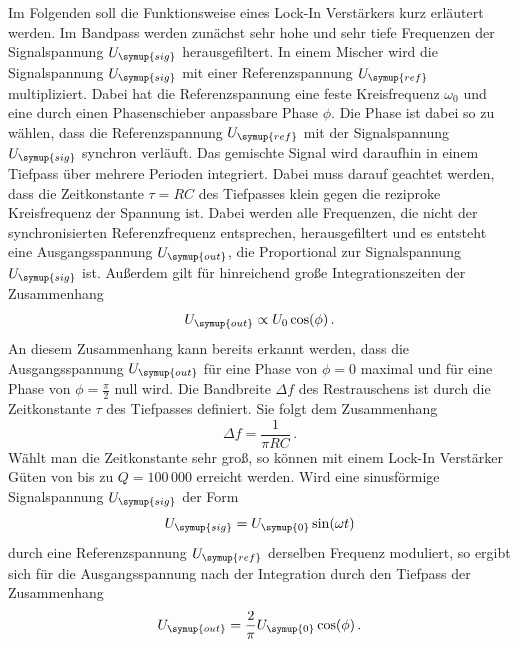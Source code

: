 Im Folgenden soll die Funktionsweise eines Lock-In Verstärkers kurz erläutert
werden. Im Bandpass werden zunächst sehr hohe und sehr tiefe Frequenzen der
Signalspannung $U_{\symup{sig}}$ herausgefiltert. In einem Mischer wird die
Signalspannung $U_{\symup{sig}}$ mit einer Referenzspannung $U_{\symup{ref}}$
multipliziert. Dabei hat die Referenzspannung eine feste Kreisfrequenz
$\omega_0$ und eine durch einen Phasenschieber anpassbare Phase $\phi$. Die Phase
ist dabei so zu wählen, dass die Referenzspannung $U_{\symup{ref}}$ mit der
Signalspannung $U_{\symup{sig}}$ synchron verläuft. Das gemischte Signal wird
daraufhin in einem Tiefpass über mehrere Perioden integriert. Dabei muss darauf
geachtet werden, dass  die Zeitkonstante $\tau=RC$ des Tiefpasses klein gegen die
reziproke Kreisfrequenz der Spannung ist. Dabei werden alle Frequenzen, die nicht
der synchronisierten Referenzfrequenz entsprechen, herausgefiltert und es entsteht
eine Ausgangsspannung $U_{\symup{out}}$, die Proportional zur Signalspannung
$U_{\symup{sig}}$ ist. Außerdem gilt für hinreichend große Integrationszeiten
der Zusammenhang
\begin{equation}
  U_{\symup{out}}\propto U_0 \cos(\phi) \,.
  \label{eqn:U_out_prop}
\end{equation}
An diesem Zusammenhang kann bereits erkannt werden, dass die Ausgangsspannung
$U_{\symup{out}}$ für eine Phase von $\phi=0$ maximal und für eine Phase von
$\phi=\frac{\pi}{2}$ null wird.
Die Bandbreite $\Delta f$ des Restrauschens ist durch die Zeitkonstante $\tau$ des Tiefpasses
definiert. Sie folgt dem Zusammenhang
\begin{equation}
  \Delta f=\frac{1}{\pi R C} \,.
  \label{eqn:bandbreite}
\end{equation}
Wählt man die Zeitkonstante sehr groß, so können mit einem Lock-In Verstärker Güten
von bis zu $Q=100 \, 000$ erreicht werden.
Wird eine sinusförmige Signalspannung $U_{\symup{sig}}$ der Form
\begin{equation}
  U_{\symup{sig}}=U_{\symup{0}}\sin(\omega t)
\end{equation}
durch eine Referenzspannung $U_{\symup{ref}}$ derselben Frequenz moduliert, so
ergibt sich für die Ausgangsspannung nach der Integration durch den Tiefpass
der Zusammenhang
\begin{equation}
  U_{\symup{out}}=\frac{2}{\pi}U_{\symup{0}}\cos(\phi)\,.
\end{equation}
